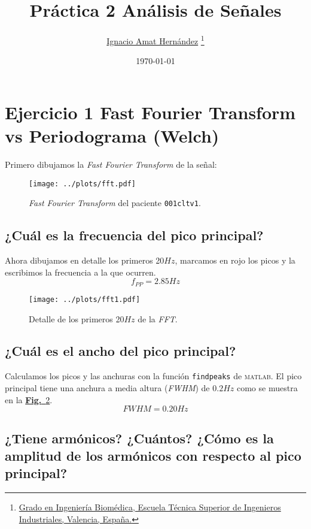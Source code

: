 \documentclass{article}
\title{\textbf{Práctica 2 Análisis de Señales}}
\date{\today}
\author{
\href{mailto:igamher@etsid.upv.es}{Ignacio Amat Hernández}
\thanks{\href{https://www.upv.es/titulaciones/GIB/indexc.html}{Grado en Ingeniería Biomédica, Escuela Técnica Superior de Ingenieros Industriales, Valencia, España.}}
}
\begin{document}
\maketitle
\section{Ejercicio 1 Fast Fourier Transform vs Periodograma (Welch)}

Primero dibujamos la \textit{Fast Fourier Transform} de la señal:
\vfill
\begin{figure}[h]
\centering
\texttt{[image: ../plots/fft.pdf]}
\vspace{-1.5cm}
\caption{\textit{Fast Fourier Transform} del paciente \lstinline[style=matlab-editor]{001cltv1}.}
\label{fig:fft}
\end{figure}
\vfill
\newpage

\subsection{¿Cuál es la frecuencia del pico principal?}
Ahora dibujamos en detalle los primeros 20$Hz$, marcamos en rojo los
picos y la escribimos la frecuencia a la que ocurren.
\begin{equation}
f_{PP} = 2.85 Hz
\end{equation}
\vspace{-1cm}
\begin{figure}[h]
\centering
\texttt{[image: ../plots/fft1.pdf]}
\vspace{-1.5cm}
\caption{Detalle de los primeros 20$Hz$ de la \textit{FFT}.}
\label{fig:picos}
\end{figure}

\vspace{-1cm}
\subsection{¿Cuál es el ancho del pico principal?}

Calculamos los picos y las anchuras con la función
\lstinline[style=matlab-editor]{findpeaks} de
\textsc{matlab}.
El pico principal tiene una anchura a media altura (\textit{FWHM}) de
$0.2Hz$ como se muestra en la \hyperref[fig:picos]{\textbf{Fig.}~\ref*{fig:picos}}.
\begin{equation}
FWHM = 0.20 Hz
\end{equation}
\vspace{-1.5cm}
\subsection{¿Tiene  armónicos?  ¿Cuántos? ¿Cómo es la amplitud  de
los armónicos con respecto al pico principal?}
\end{document}
